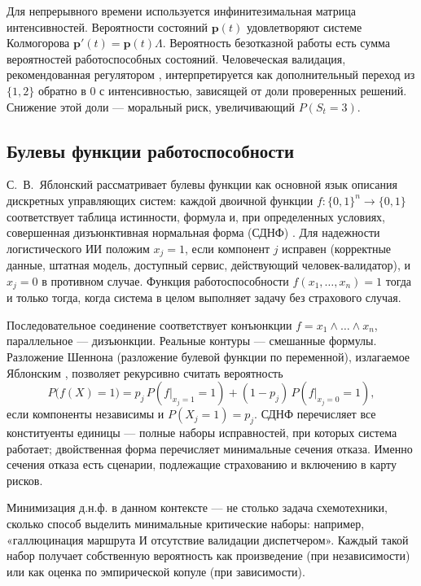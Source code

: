 \documentclass[a4paper,14pt]{extarticle}
\begin{document}
Для непрерывного времени используется инфинитезимальная матрица интенсивностей. Вероятности состояний $\mathbf{p}(t)$ удовлетворяют системе Колмогорова $\mathbf{p}'(t)=\mathbf{p}(t)\Lambda$. Вероятность безотказной работы есть сумма вероятностей работоспособных состояний. Человеческая валидация, рекомендованная регулятором \cite{cbr}, интерпретируется как дополнительный переход из $\{1,2\}$ обратно в $0$ с интенсивностью, зависящей от доли проверенных решений. Снижение этой доли --- моральный риск, увеличивающий $P(S_t=3)$.

\subsection{Булевы функции работоспособности}

С.~В.~Яблонский рассматривает булевы функции как основной язык описания дискретных управляющих систем: каждой двоичной функции $f:\{0,1\}^n\to\{0,1\}$ соответствует таблица истинности, формула и, при определенных условиях, совершенная дизъюнктивная нормальная форма (СДНФ) \cite{yablonsky}. Для надежности логистического ИИ положим $x_j=1$, если компонент $j$ исправен (корректные данные, штатная модель, доступный сервис, действующий человек-валидатор), и $x_j=0$ в противном случае. Функция работоспособности $f(x_1,\ldots,x_n)=1$ тогда и только тогда, когда система в целом выполняет задачу без страхового случая.

Последовательное соединение соответствует конъюнкции $f=x_1\land\ldots\land x_n$, параллельное --- дизъюнкции. Реальные контуры --- смешанные формулы. Разложение Шеннона (разложение булевой функции по переменной), излагаемое Яблонским \cite{yablonsky}, позволяет рекурсивно считать вероятность
\begin{equation}
P\bigl(f(X)=1\bigr)=p_j\,P(f\bigr|_{x_j=1}=1)+(1-p_j)\,P(f\bigr|_{x_j=0}=1),
\label{eq:shannon}
\end{equation}
если компоненты независимы и $P(X_j=1)=p_j$. СДНФ перечисляет все конституенты единицы --- полные наборы исправностей, при которых система работает; двойственная форма перечисляет минимальные сечения отказа. Именно сечения отказа есть сценарии, подлежащие страхованию и включению в карту рисков.

Минимизация д.н.ф. \cite{yablonsky} в данном контексте --- не столько задача схемотехники, сколько способ выделить минимальные критические наборы: например, «галлюцинация маршрута И отсутствие валидации диспетчером». Каждый такой набор получает собственную вероятность как произведение (при независимости) или как оценка по эмпирической копуле (при зависимости).
\end{document}
